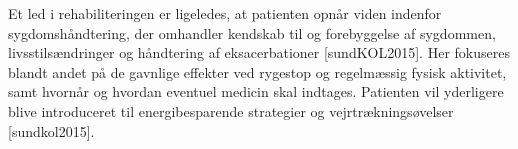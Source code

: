 Et led i rehabiliteringen er ligeledes, at patienten opnår viden indenfor sygdomshåndtering, der omhandler kendskab til og forebyggelse af sygdommen, livsstilsændringer og håndtering af eksacerbationer\cite{McCarthy2015} [sundKOL2015]. Her fokuseres blandt andet på de gavnlige effekter ved rygestop og regelmæssig fysisk aktivitet, samt hvornår og hvordan eventuel medicin skal indtages. Patienten vil yderligere blive introduceret til energibesparende strategier og vejrtrækningsøvelser \cite{McCarthy2015} [sundkol2015].   

